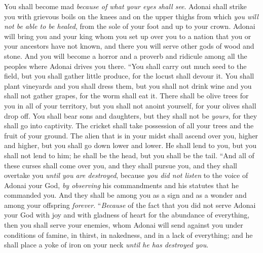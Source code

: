\begin{biblechapter}
\verse You shall become mad \textit{because of what your eyes shall see}.
\verse Adonai shall strike you with grievous boils on the knees and on the upper thighs from which \textit{you will not be able to be healed}, from the sole of your foot and up to your crown.
\verse Adonai will bring you and your king whom you set up over you to a nation that you or your ancestors have not known, and there you will serve other gods of wood and stone.
\verse And you will become a horror and a proverb and ridicule among all the peoples where Adonai drives you there.
\verse “You shall carry out much seed to the field, but you shall gather little produce, for the locust shall devour it.
\verse You shall plant vineyards and you shall dress them, but you shall not drink wine and you shall not gather grapes, for the worm shall eat it.
\verse There shall be olive trees for you in all of your territory, but you shall not anoint yourself, for your olives shall drop off.
\verse You shall bear sons and daughters, but they shall not be \textit{yours}, for they shall go into captivity.
\verse The cricket shall take possession of all your trees and the fruit of your ground.
\verse The alien that is in your midst shall ascend over you, higher and higher, but you shall go down lower and lower.
\verse He shall lend to you, but you shall not lend to him; he shall be the head, but you shall be the tail.
\verse “And all of these curses shall come over you, and they shall pursue you, and they shall overtake you \textit{until you are destroyed}, because \textit{you did not listen} to the voice of Adonai your God, \textit{by observing} his commandments and his statutes that he commanded you.
\verse And they shall be among you as a sign and as a wonder and among your offspring \textit{forever}.
\verse “\textit{Because} of the fact that you did not serve Adonai your God with joy and with gladness of heart for the abundance of everything,
\verse then you shall serve your enemies, whom Adonai will send against you under conditions of famine, in thirst, in nakedness, and in a lack of everything; and he shall place a yoke of iron on your neck \textit{until he has destroyed you}.

\end{biblechapter}
